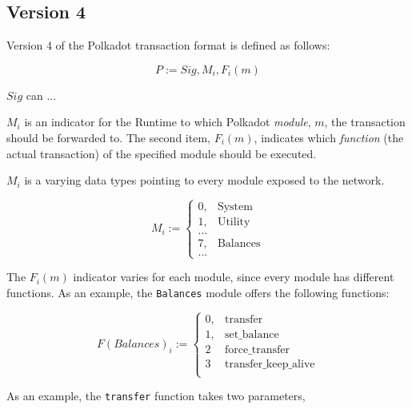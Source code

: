 \subsection{Version 4}

Version 4 of the Polkadot transaction format is defined as follows:

\[
    P := Sig, M_i, F_i(m)
\]

$Sig$ can ...
\newline

$M_i$ is an indicator for the Runtime to which Polkadot \textit{module}, $m$,
the transaction should be forwarded to. The second item, $F_i(m)$, indicates
which \textit{function} (the actual transaction) of the specified module should
be executed.
\newline

$M_i$ is a varying data types pointing to every module exposed to the network.

\[
M_i :=
\begin{cases}
0, & \text{System} \\
1, & \text{Utility} \\
... & \\
7, & \text{Balances} \\
... &
\end{cases}
\]

The $F_i(m)$ indicator varies for each module, since every module has different
functions. As an example, the \verb|Balances| module offers the following
functions:

\[
F(Balances)_i :=
\begin{cases}
0, & \text{transfer} \\
1, & \text{set\_balance} \\
2 & \text{force\_transfer} \\
3 & \text{transfer\_keep\_alive} \\
\end{cases}
\]

As an example, the \verb|transfer| function takes two parameters, 
